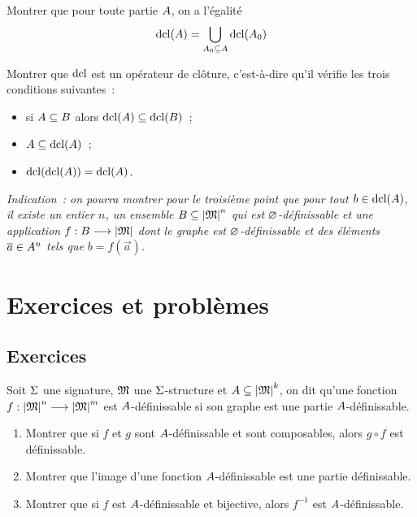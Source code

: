 \begin{exercise}
  Montrer que pour toute partie $A$, on a l'égalité
  \[\operatorname{dcl}(A) = \bigcup_{A_0\subseteq A} \operatorname{dcl}(A_0)\]
\end{exercise}

\begin{exercise}
  Montrer que $\operatorname{dcl}$ est un opérateur de clôture, c'est-à-dire qu'il vérifie les
  trois conditions suivantes~:
  \begin{itemize}
  \item si $A\subseteq B$ alors $\operatorname{dcl}(A)\subseteq\operatorname{dcl}(B)$~;
  \item $A\subseteq\operatorname{dcl}(A)$~;
  \item $\operatorname{dcl}(\operatorname{dcl}(A)) = \operatorname{dcl}(A)$.
  \end{itemize}
  \textit{Indication~: on pourra montrer pour le troisième point que pour tout
    $b \in \operatorname{dcl}(A)$, il existe un entier $n$, un ensemble
    $B\subseteq\left\vert \mathfrak{M}\right\vert^n$ qui est $\varnothing$-définissable et une application
    $f : \displaystyle B \longrightarrow \left\vert \mathfrak{M}\right\vert$ dont le graphe est $\varnothing$-définissable
    et des éléments $\overline{a}\in A^n$ tels que $b = f(\vec a)$.}
\end{exercise}

\clearpage

\section{Exercices et problèmes}

\subsection{Exercices}

\begin{exercise}
  Soit $\Sigma$ une signature, $\mathfrak{M}$ une $\Sigma$-structure et
  $A\subseteq\left\vert \mathfrak{M}\right\vert^k$, on dit qu'une fonction
  $f : \displaystyle \left\vert \mathfrak{M}\right\vert^n \longrightarrow \left\vert \mathfrak{M}\right\vert^m$ est $A$-définissable si son graphe
  est une partie $A$-définissable.
  \begin{enumerate}[label=(\roman*)]
  \item Montrer que si $f$ et $g$ sont $A$-définissable et sont
    composables, alors $g\circ f$ est définissable.
  \item Montrer que l'image d'une fonction $A$-définissable est une partie
    définissable.
  \item Montrer que si $f$ est $A$-définissable et bijective, alors
    $f^{-1}$ est $A$-définissable.
  \end{enumerate}
\end{exercise}


